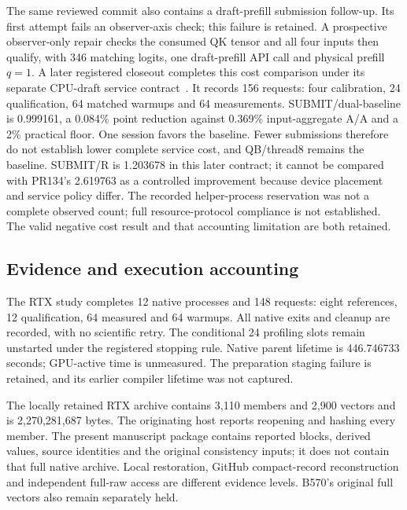 The same reviewed commit also contains a draft-prefill submission follow-up. Its first attempt fails an observer-axis check; this failure is retained. A prospective observer-only repair checks the consumed QK tensor and all four inputs then qualify, with 346 matching logits, one draft-prefill API call and physical prefill $q=1$. A later registered closeout completes this cost comparison under its separate CPU-draft service contract~\cite{b570prefillrecords}. It records 156 requests: four calibration, 24 qualification, 64 matched warmups and 64 measurements. SUBMIT/dual-baseline is 0.999161, a 0.084\% point reduction against 0.369\% input-aggregate A/A and a 2\% practical floor. One session favors the baseline. Fewer submissions therefore do not establish lower complete service cost, and QB/thread8 remains the baseline. SUBMIT/R is 1.203678 in this later contract; it cannot be compared with PR134's 2.619763 as a controlled improvement because device placement and service policy differ. The recorded helper-process reservation was not a complete observed count; full resource-protocol compliance is not established. The valid negative cost result and that accounting limitation are both retained.

\subsection{Evidence and execution accounting}
The RTX study completes 12 native processes and 148 requests: eight references, 12 qualification, 64 measured and 64 warmups. All native exits and cleanup are recorded, with no scientific retry. The conditional 24 profiling slots remain unstarted under the registered stopping rule. Native parent lifetime is 446.746733 seconds; GPU-active time is unmeasured. The preparation staging failure is retained, and its earlier compiler lifetime was not captured.

The locally retained RTX archive contains 3,110 members and 2,900 vectors and is 2,270,281,687 bytes. The originating host reports reopening and hashing every member. The present manuscript package contains reported blocks, derived values, source identities and the original consistency inputs; it does not contain that full native archive. Local restoration, GitHub compact-record reconstruction and independent full-raw access are different evidence levels. B570's original full vectors also remain separately held.
